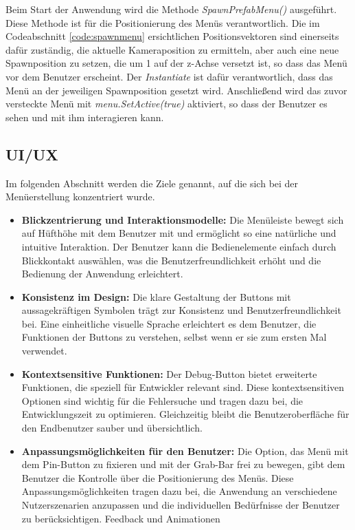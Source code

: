 Beim Start der Anwendung wird die Methode \textit{SpawnPrefabMenu()} ausgeführt. Diese Methode ist für die Positionierung
des Menüs verantwortlich. Die im Codeabschnitt \ref{code:spawnmenu} ersichtlichen Positionsvektoren sind einerseits dafür
zuständig, die aktuelle Kameraposition zu ermitteln, aber auch eine neue Spawnposition zu setzen, die um 1 auf der z-Achse
versetzt ist, so dass das Menü vor dem Benutzer erscheint. Der \textit{Instantiate} ist dafür verantwortlich, dass das Menü
an der jeweiligen Spawnposition gesetzt wird. Anschließend wird das zuvor versteckte Menü mit \textit{menu.SetActive(true)}
aktiviert, so dass der Benutzer es sehen und mit ihm interagieren kann.

\subsection{UI/UX}
Im folgenden Abschnitt werden die Ziele genannt, auf die sich bei der Menüerstellung konzentriert wurde.
\begin{itemize}
\item \textbf{Blickzentrierung und Interaktionsmodelle:}
Die Menüleiste bewegt sich auf Hüfthöhe mit dem Benutzer mit und ermöglicht so eine natürliche und intuitive Interaktion.
Der Benutzer kann die Bedienelemente einfach durch Blickkontakt auswählen, was die Benutzerfreundlichkeit erhöht und die
Bedienung der Anwendung erleichtert.
\item \textbf{Konsistenz im Design:}
Die klare Gestaltung der Buttons mit aussagekräftigen Symbolen trägt zur Konsistenz und Benutzerfreundlichkeit bei.
Eine einheitliche visuelle Sprache erleichtert es dem Benutzer, die Funktionen der Buttons zu verstehen, selbst wenn er
sie zum ersten Mal verwendet.
\item \textbf{Kontextsensitive Funktionen:}
Der Debug-Button bietet erweiterte Funktionen, die speziell für Entwickler relevant sind. Diese kontextsensitiven
Optionen sind wichtig für die Fehlersuche und tragen dazu bei, die Entwicklungszeit zu optimieren. Gleichzeitig bleibt
die Benutzeroberfläche für den Endbenutzer sauber und übersichtlich.
\item \textbf{Anpassungsmöglichkeiten für den Benutzer:}
Die Option, das Menü mit dem Pin-Button zu fixieren und mit der Grab-Bar frei zu bewegen, gibt dem Benutzer die
Kontrolle über die Positionierung des Menüs. Diese Anpassungsmöglichkeiten tragen dazu bei, die Anwendung an
verschiedene Nutzerszenarien anzupassen und die individuellen Bedürfnisse der Benutzer zu berücksichtigen.
Feedback und Animationen
\end{itemize}

